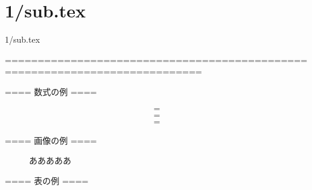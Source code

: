 \documentclass[12pt,a4j]{jarticle}
\begin{document}
\fi
\section{1/sub.tex}
1/sub.tex





============================================================================

==== 数式の例 ====

\begin{eqnarray}
	&	=	&	\\
	&	=	&	\nonumber \\
	&	=	&	
\end{eqnarray}


==== 画像の例 ====

\begin{figure}[H]
	\centering
	\caption{あああああ}
	\label{aaaaaa}
\end{figure}


==== 表の例 ====
\end{document}
